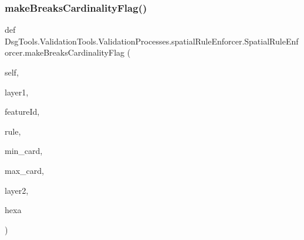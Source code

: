 \subsubsection{\texorpdfstring{make\+Breaks\+Cardinality\+Flag()}{makeBreaksCardinalityFlag()}}
{\footnotesize\ttfamily def Dsg\+Tools.\+Validation\+Tools.\+Validation\+Processes.\+spatial\+Rule\+Enforcer.\+Spatial\+Rule\+Enforcer.\+make\+Breaks\+Cardinality\+Flag (\begin{DoxyParamCaption}\item[{}]{self,  }\item[{}]{layer1,  }\item[{}]{feature\+Id,  }\item[{}]{rule,  }\item[{}]{min\+\_\+card,  }\item[{}]{max\+\_\+card,  }\item[{}]{layer2,  }\item[{}]{hexa }\end{DoxyParamCaption})}

